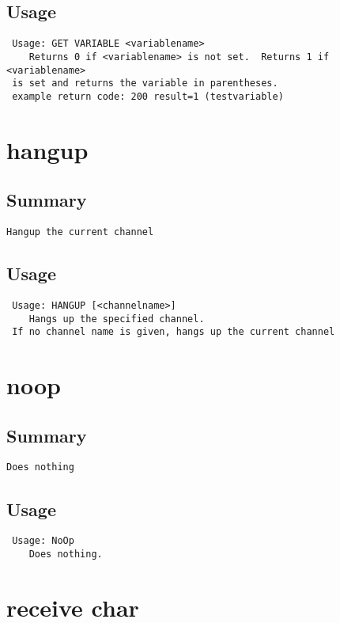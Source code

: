 \subsection{Usage}
\begin{verbatim}
 Usage: GET VARIABLE <variablename>
	Returns 0 if <variablename> is not set.  Returns 1 if <variablename>
 is set and returns the variable in parentheses.
 example return code: 200 result=1 (testvariable)

\end{verbatim}


\section{hangup}
\subsection{Summary}
\begin{verbatim}
Hangup the current channel
\end{verbatim}
\subsection{Usage}
\begin{verbatim}
 Usage: HANGUP [<channelname>]
	Hangs up the specified channel.
 If no channel name is given, hangs up the current channel

\end{verbatim}


\section{noop}
\subsection{Summary}
\begin{verbatim}
Does nothing
\end{verbatim}
\subsection{Usage}
\begin{verbatim}
 Usage: NoOp
	Does nothing.

\end{verbatim}


\section{receive char}
